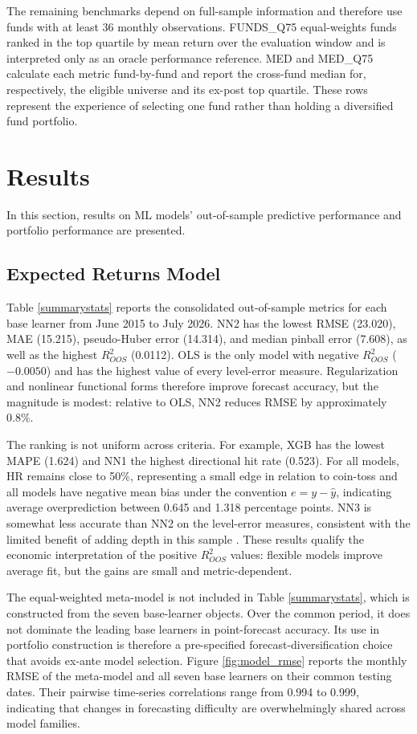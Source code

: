 \documentclass[preprint,12pt,authoryear]{elsarticle}
\begin{document}
The remaining benchmarks depend on full-sample information and therefore use funds with at least 36 monthly observations. FUNDS\_Q75 equal-weights funds ranked in the top quartile by mean return over the evaluation window and is interpreted only as an oracle performance reference. MED and MED\_Q75 calculate each metric fund-by-fund and report the cross-fund median for, respectively, the eligible universe and its ex-post top quartile. These rows represent the experience of selecting one fund rather than holding a diversified fund portfolio.

\section{Results}
In this section, results on ML models' out-of-sample predictive performance and portfolio performance are presented.

\subsection{Expected Returns Model}

Table \ref{summarystats} reports the consolidated out-of-sample metrics for each base learner from June 2015 to July 2026. NN2 has the lowest RMSE (23.020), MAE (15.215), pseudo-Huber error (14.314), and median pinball error (7.608), as well as the highest $R_{OOS}^{2}$ (0.0112). OLS is the only model with negative $R_{OOS}^{2}$ ($-0.0050$) and has the highest value of every level-error measure. Regularization and nonlinear functional forms therefore improve forecast accuracy, but the magnitude is modest: relative to OLS, NN2 reduces RMSE by approximately 0.8\%.

The ranking is not uniform across criteria. For example, XGB has the lowest MAPE (1.624) and NN1 the highest directional hit rate (0.523). For all models, HR remains close to 50\%, representing a small edge in relation to coin-toss and all models have negative mean bias under the convention $e=y-\widehat{y}$, indicating average overprediction between 0.645 and 1.318 percentage points. NN3 is somewhat less accurate than NN2 on the level-error measures, consistent with the limited benefit of adding depth in this sample \citep{kellyxiu2023}. These results qualify the economic interpretation of the positive $R_{OOS}^{2}$ values: flexible models improve average fit, but the gains are small and metric-dependent.

The equal-weighted meta-model is not included in Table \ref{summarystats}, which is constructed from the seven base-learner objects. Over the common period, it does not dominate the leading base learners in point-forecast accuracy. Its use in portfolio construction is therefore a pre-specified forecast-diversification choice that avoids ex-ante model selection. Figure \ref{fig:model_rmse} reports the monthly RMSE of the meta-model and all seven base learners on their common testing dates. Their pairwise time-series correlations range from 0.994 to 0.999, indicating that changes in forecasting difficulty are overwhelmingly shared across model families.
\end{document}
